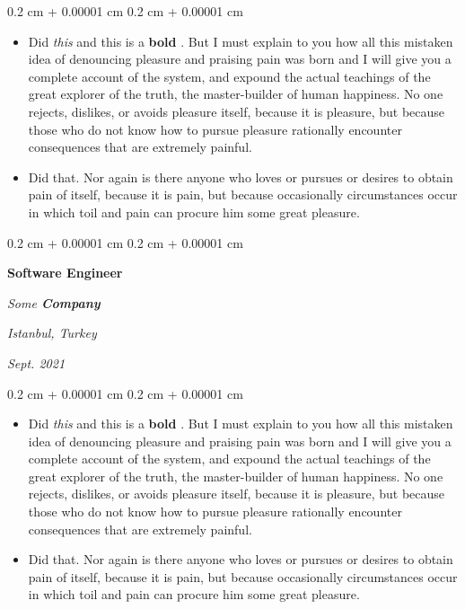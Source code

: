 \documentclass[10pt, letterpaper]{article}
\newenvironment{highlights}{
    \begin{itemize}[
        topsep=0.10 cm,
        parsep=0.10 cm,
        partopsep=0pt,
        itemsep=0pt,
        leftmargin=0.4 cm + 10pt + 0.6 cm
    ]
}{
    \end{itemize}
} %
\newenvironment{onecolentry}{
    \begin{adjustwidth}{
        0.2 cm + 0.00001 cm
    }{
        0.2 cm + 0.00001 cm
    }
}{
    \end{adjustwidth}
} %
\newenvironment{threecolentry}[3][]{
    \onecolentry
    \def\thirdColumn{#3}
    \setcolumnwidth{0.6 cm, \fill, 4.5 cm}
    \begin{paracol}{3}
    #2 \switchcolumn
}{
    \switchcolumn \raggedleft \thirdColumn
    \end{paracol}
    \endonecolentry
} %
\let\hrefWithoutArrow\href
\renewcommand{\href}[2]{\hrefWithoutArrow{#1}{\mbox{\ifthenelse{\equal{#2}{}}{ }{#2 }\raisebox{.15ex}{\footnotesize \faExternalLink*}}}}
\begin{document}
        \vspace{0.10 cm-3px}
        \begin{onecolentry}
            \begin{highlights}
                \item Did \textit{this} and this is a \textbf{bold} \href{https://example.com}{link}. But I must explain to you how all this mistaken idea of denouncing pleasure and praising pain was born and I will give you a complete account of the system, and expound the actual teachings of the great explorer of the truth, the master-builder of human happiness. No one rejects, dislikes, or avoids pleasure itself, because it is pleasure, but because those who do not know how to pursue pleasure rationally encounter consequences that are extremely painful.
                \item Did that. Nor again is there anyone who loves or pursues or desires to obtain pain of itself, because it is pain, but because occasionally circumstances occur in which toil and pain can procure him some great pleasure.
            \end{highlights}
        \end{onecolentry}


        \vspace{0.2 cm-3px}

        \begin{threecolentry}{
            \vspace*{\fill}
            \textbullet
            \vspace*{3px}
            \vspace*{\fill}
        }{
        \textit{Istanbul, Turkey}    
            
        \textit{Sept. 2021}}
            \textbf{Software Engineer}
            
            \textit{Some \textbf{Company}}
        \end{threecolentry}

        \vspace{0.10 cm-3px}
        \begin{onecolentry}
            \begin{highlights}
                \item Did \textit{this} and this is a \textbf{bold} \href{https://example.com}{link}. But I must explain to you how all this mistaken idea of denouncing pleasure and praising pain was born and I will give you a complete account of the system, and expound the actual teachings of the great explorer of the truth, the master-builder of human happiness. No one rejects, dislikes, or avoids pleasure itself, because it is pleasure, but because those who do not know how to pursue pleasure rationally encounter consequences that are extremely painful.
                \item Did that. Nor again is there anyone who loves or pursues or desires to obtain pain of itself, because it is pain, but because occasionally circumstances occur in which toil and pain can procure him some great pleasure.
            \end{highlights}
        \end{onecolentry}
\end{document}
